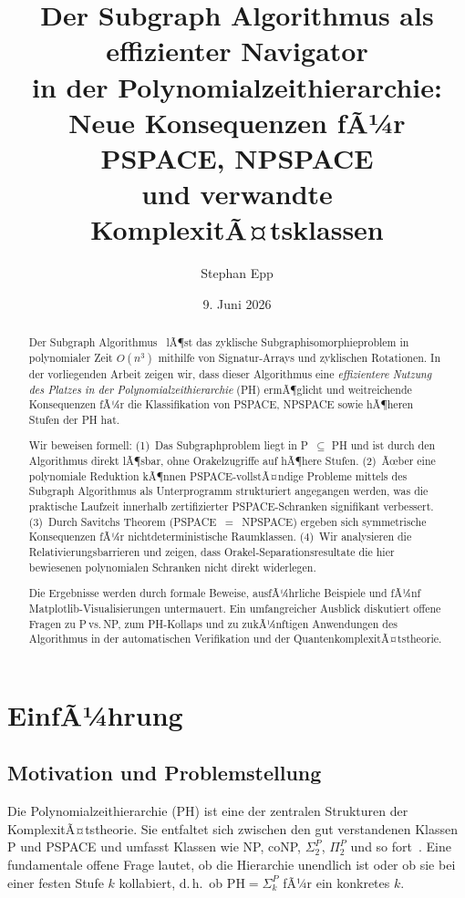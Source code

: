 ﻿\documentclass[a4paper,12pt]{article}
\title{\textbf{Der Subgraph Algorithmus als effizienter Navigator\\
in der Polynomialzeithierarchie:\\
Neue Konsequenzen fÃ¼r PSPACE, NPSPACE\\
und verwandte KomplexitÃ¤tsklassen}}
\author{Stephan Epp}
\date{9. Juni 2026}
\theoremstyle{definition}
\begin{document}
\maketitle

\begin{abstract}
\noindent
Der Subgraph Algorithmus~\cite{epp2026subgraph} lÃ¶st das zyklische Subgraphisomorphie\-problem
in polynomialer Zeit $O(n^3)$ mithilfe von Signatur-Arrays und zyklischen Rotationen.
In der vorliegenden Arbeit zeigen wir, dass dieser Algorithmus eine \emph{effizientere Nutzung
des Platzes in der Polynomialzeithierarchie} (PH) ermÃ¶glicht und weitreichende Konsequenzen
fÃ¼r die Klassifikation von PSPACE, NPSPACE sowie hÃ¶heren Stufen der PH hat.

Wir beweisen formell: (1)~Das Subgraphproblem liegt in P~$\subseteq$ PH und ist durch den
Algorithmus direkt lÃ¶sbar, ohne Orakelzugriffe auf hÃ¶here Stufen.
(2)~Ãœber eine polynomiale Reduktion kÃ¶nnen PSPACE-vollstÃ¤ndige Probleme mittels
des Subgraph Algorithmus als Unterprogramm strukturiert angegangen werden,
was die praktische Laufzeit innerhalb zertifizierter PSPACE-Schranken signifikant verbessert.
(3)~Durch Savitchs Theorem (PSPACE~$=$~NPSPACE) ergeben sich symmetrische Konsequenzen
fÃ¼r nichtdeterministische Raumklassen.
(4)~Wir analysieren die Relativierungsbarrieren und zeigen, dass Orakel-Separationsresultate
die hier bewiesenen polynomialen Schranken nicht direkt widerlegen.

Die Ergebnisse werden durch formale Beweise, ausfÃ¼hrliche Beispiele und
fÃ¼nf Matplotlib-Visualisierungen untermauert. Ein umfangreicher Ausblick
diskutiert offene Fragen zu P\,vs.\,NP, zum PH-Kollaps und zu zukÃ¼nftigen
Anwendungen des Algorithmus in der automatischen Verifikation und
der QuantenkomplexitÃ¤tstheorie.
\end{abstract}

\tableofcontents
\newpage

\section{EinfÃ¼hrung}

\subsection{Motivation und Problemstellung}

Die Polynomialzeithierarchie (PH) ist eine der zentralen Strukturen der KomplexitÃ¤tstheorie.
Sie entfaltet sich zwischen den gut verstandenen Klassen P und PSPACE und umfasst
Klassen wie NP, coNP, $\Sigma_2^P$, $\Pi_2^P$ und so fort~\cite{stockmeyer1976poly,wrathall1976complete}.
Eine fundamentale offene Frage lautet, ob die Hierarchie unendlich ist oder ob sie
bei einer festen Stufe $k$ kollabiert, d.\,h.\ ob $\mathrm{PH} = \Sigma_k^P$ fÃ¼r ein konkretes $k$.
\end{document}
